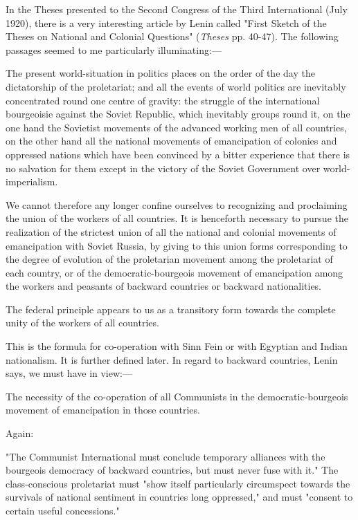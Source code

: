 In the Theses presented to the Second Congress of the Third International (July 1920), there is a very interesting article by Lenin called "First Sketch of the Theses on National and Colonial Questions" (\emph{Theses} pp. 40-47). The following passages seemed to me particularly illuminating:---
\begin{displayquote}
The present world-situation in politics places on the order of the day the dictatorship of the proletariat; and all the events of world politics are inevitably concentrated round one centre of gravity: the struggle of the international bourgeoisie against the Soviet Republic, which inevitably groups round it, on the one hand the Sovietist movements of the advanced working men of all countries, on the other hand all the national movements of emancipation of colonies and oppressed nations which have been convinced by a bitter experience that there is no salvation for them except in the victory of the Soviet Government over world-imperialism.

We cannot therefore any longer confine ourselves to recognizing and proclaiming the union of the workers of all countries. It is henceforth necessary to pursue the realization of the strictest union of all the national and colonial movements of emancipation with Soviet Russia, by giving to this union forms corresponding to the degree of evolution of the proletarian movement among the proletariat of each country, or of the democratic-bourgeois movement of emancipation among the workers and peasants of backward countries or backward nationalities.

The federal principle appears to us as a transitory form towards the complete unity of the workers of all countries.
\end{displayquote}
This is the formula for co-operation with Sinn Fein or with Egyptian and Indian nationalism. It is further defined later. In regard to backward countries, Lenin says, we must have in view:---
\begin{displayquote}
The necessity of the co-operation of all Communists in the democratic-bourgeois movement of emancipation in those countries.
\end{displayquote}
Again:
\begin{displayquote}
"The Communist International must conclude temporary alliances with the bourgeois democracy of backward countries, but must never fuse with it." The class-conscious proletariat must "show itself particularly circumspect towards the survivals of national sentiment in countries long oppressed," and must "consent to certain useful concessions."
\end{displayquote}
